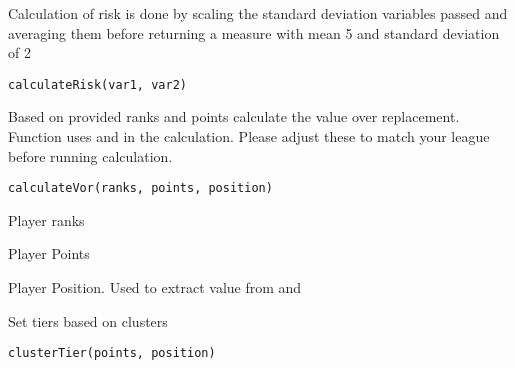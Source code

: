 \documentclass[a4paper]{book}
\begin{document}
%
\begin{Description}\relax
Calculation of risk is done by scaling the standard deviation variables
passed and averaging them before returning a measure with mean 5 and standard
deviation of 2
\end{Description}
%
\begin{Usage}
\begin{verbatim}
calculateRisk(var1, var2)
\end{verbatim}
\end{Usage}
%
\begin{Description}\relax
Based on provided ranks and points calculate the value over replacement.
Function uses  and  in the calculation.
Please adjust these to match your league before running calculation.
\end{Description}
%
\begin{Usage}
\begin{verbatim}
calculateVor(ranks, points, position)
\end{verbatim}
\end{Usage}
%
\begin{Arguments}
\begin{ldescription}
\item[\code{ranks}] Player ranks

\item[\code{points}] Player Points

\item[\code{position}] Player Position. Used to extract value from 
and 
\end{ldescription}
\end{Arguments}
%
\begin{Description}\relax
Set tiers based on clusters
\end{Description}
%
\begin{Usage}
\begin{verbatim}
clusterTier(points, position)
\end{verbatim}
\end{Usage}
\end{document}
